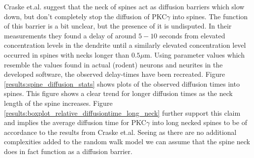 \documentclass[main.tex]{subfiles}
\begin{document}
Craske et.al. suggest that the neck of spines act as diffusion barriers which slow down, but don't completely stop the diffusion of PKC$\gamma$ into spines. 
The function of this barrier is a bit unclear, but the presence of it is undisputed. 
In their measurements they found a delay of around $5-10$ seconds from elevated concentration levels in the dendrite until a similarly elevated concentration level occurred in spines with necks longer than $0.5\mu$m. 
Using parameter values which resemble the values found in actual (rodent) neurons and neurites in the developed software, the observed delay-times have been recreated. 
Figure \ref{results:spine_diffusion_stats} shows plots of the observed diffusion times into spines. 
This figure shows a clear trend for longer diffusion times as the neck length of the spine increases. 
Figure \ref{results:boxplot_relative_diffusiontime_long_neck} further support this claim and implies the average diffusion time for PKC$\gamma$ into long necked spines to be of accordance to the results from Craske et.al.
Seeing as there are no additional complexities added to the random walk model we can assume that the spine neck does in fact function as a diffusion barrier.
\end{document}
